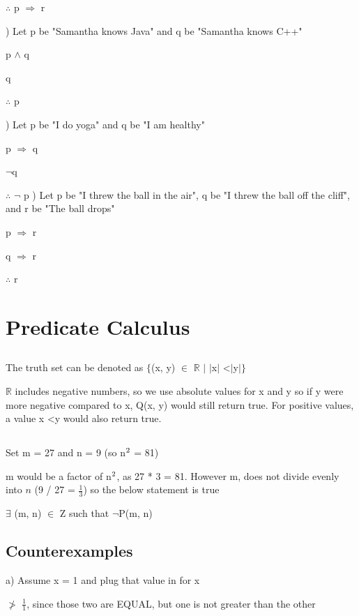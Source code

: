 \documentclass{article}
\begin{document}
    $\therefore$ p $\Rightarrow$ r \par\par
    ) Let p be "Samantha knows Java" and q be "Samantha knows C++"\par
    p $\wedge$ q \par
    q \par
    $\therefore$ p \par
    ) Let p be "I do yoga" and q be "I am healthy"\par
    p $\Rightarrow$ q\par
    $\neg$q \par
    $\therefore$ $\neg$ p
    ) Let p be "I threw the ball in the air", q be "I threw the ball off the cliff", and r be "The ball drops"\par
    p $\Rightarrow$ r\par
    q $\Rightarrow$ r\par
    $\therefore$ r\par
    \noindent
    
\section{Predicate Calculus}

\subsection{}
    The truth set can be denoted as $\{$(x, y) $\in$ $\mathbb{R}$ $\mid$ $\mid$x$\mid$  \textless  $\mid$y$\mid$$\}$ \par\par
    \noindent
    \noindent
    $\mathbb{R}$ includes negative numbers, so we use absolute values for x and y so if y were more negative compared to x, Q(x, y) would still return true.  For positive values, a value x \textless y would also return true.
\subsection{}
    Set m = 27 and n = 9 (so n$\textsuperscript{2}$ = 81)\par
    \noindent
    m would be a factor of n$\textsuperscript{2}$, as 27 * 3 = 81.  However m, does not divide evenly into $n$ (9 / 27 = $\frac{1}{3}$) so the below statement is true\par
    \noindent
    $\exists$ (m, n) $\in$ Z such that $\neg$P(m, n)
\subsection{Counterexamples}
    a) Assume x = 1 and plug that value in for x\par
     $\ngtr$ $\frac{1}{1}$, since those two are EQUAL, but one is not greater than the other\par
    
\end{document}
